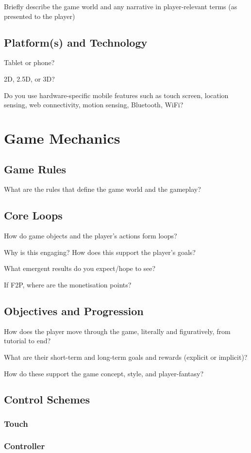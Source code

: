 \documentclass{scrartcl}
\begin{document}
Briefly describe the game world and any narrative in player-relevant terms (as presented to the player)

\subsection{Platform(s) and Technology}

Tablet or phone?

2D, 2.5D, or 3D?

Do you use hardware-specific mobile features such as touch screen, location sensing, web connectivity, motion sensing, Bluetooth, WiFi?

\section{
  Game Mechanics
 }

\subsection{Game Rules}

What are the rules that define the game world and the gameplay?

\subsection{Core Loops}

How do game objects and the player’s actions form loops?

Why is this engaging? How does this support the player’s goals?

What emergent results do you expect/hope to see?

If F2P, where are the monetisation points?

\subsection{Objectives and Progression}

How does the player move through the game, literally and figuratively, from tutorial to end?

What are their short-term and long-term goals and rewards (explicit or implicit)?

How do these support the game concept, style, and player-fantasy?

\subsection{Control Schemes}

\subsubsection{Touch}

\subsubsection{Controller}

\printbibliography
\end{document}
